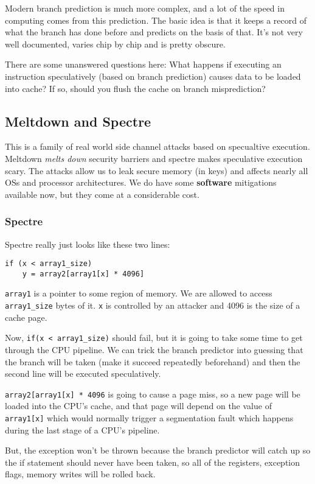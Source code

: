 \documentclass[11pt,a4paper,titlepage,dvipsnames,cmyk]{scrartcl}
\begin{document}
Modern branch prediction is much more complex, and a lot of the speed in computing comes from this prediction. The basic idea is that it keeps a record of what the branch has done before and predicts on the basis of that. It's not very well documented, varies chip by chip and is pretty obscure.

There are some unanswered questions here:  What happens if executing an instruction speculatively (based on branch prediction) causes data to be loaded into cache? If so, should you flush the cache on branch misprediction?

\subsection{Meltdown and Spectre}
This is a family of real world side channel attacks based on specualtive execution. Meltdown \textit{melts down} security barriers and spectre makes speculative execution scary. The attacks allow us to leak secure memory (in keys) and affects nearly all OSs and processor architectures. We do have some \textbf{software} mitigations available now, but they come at a considerable cost.

\subsubsection{Spectre}
Spectre really just looks like these two lines:
\begin{lstlisting}
if (x < array1_size)
    y = array2[array1[x] * 4096]
\end{lstlisting}

\texttt{array1} is a pointer to some region of memory. We are allowed to access \texttt{array1\_size} bytes of it. \texttt{x} is controlled by an attacker and 4096 is the size of a cache page.

Now, \texttt{if(x < array1\_size)} should fail, but it is going to take some time to get through the CPU pipeline. We can trick the branch predictor into guessing that the branch will be taken (make it succeed repeatedly beforehand) and then the second line will be executed speculatively.

\texttt{array2[array1[x] * 4096} is going to cause a page miss, so a new page will be loaded into the CPU's cache, and that page will depend on the value of \texttt{array1[x]} which would normally trigger a segmentation fault which happens during the last stage of a CPU's pipeline.

But, the exception won't be thrown because the branch predictor will catch up so the if statement should never have been taken, so all of the registers, exception flags, memory writes will be rolled back.
\end{document}
